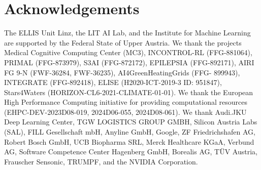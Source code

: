 
\section*{Acknowledgements}

The ELLIS Unit Linz, the LIT AI Lab, and the Institute for Machine Learning are supported by the Federal State of Upper Austria. 
We thank the projects Medical Cognitive Computing Center (MC3), INCONTROL-RL (FFG-881064), PRIMAL (FFG-873979), S3AI (FFG-872172), EPILEPSIA (FFG-892171), AIRI FG 9-N (FWF-36284, FWF-36235), AI4GreenHeatingGrids (FFG- 899943), INTEGRATE (FFG-892418), ELISE (H2020-ICT-2019-3 ID: 951847), Stars4Waters (HORIZON-CL6-2021-CLIMATE-01-01).
We thank the European High Performance Computing initiative for providing computational resources (EHPC-DEV-2023D08-019, 2024D06-055, 2024D08-061).
We thank Audi.JKU Deep Learning Center, TGW LOGISTICS GROUP GMBH, Silicon Austria Labs (SAL), FILL Gesellschaft mbH, Anyline GmbH, Google, ZF Friedrichshafen AG, Robert Bosch GmbH, UCB Biopharma SRL, Merck Healthcare KGaA, Verbund AG, Software Competence Center Hagenberg GmbH, Borealis AG, T\"{U}V Austria, Frauscher Sensonic, TRUMPF, and the NVIDIA Corporation.
